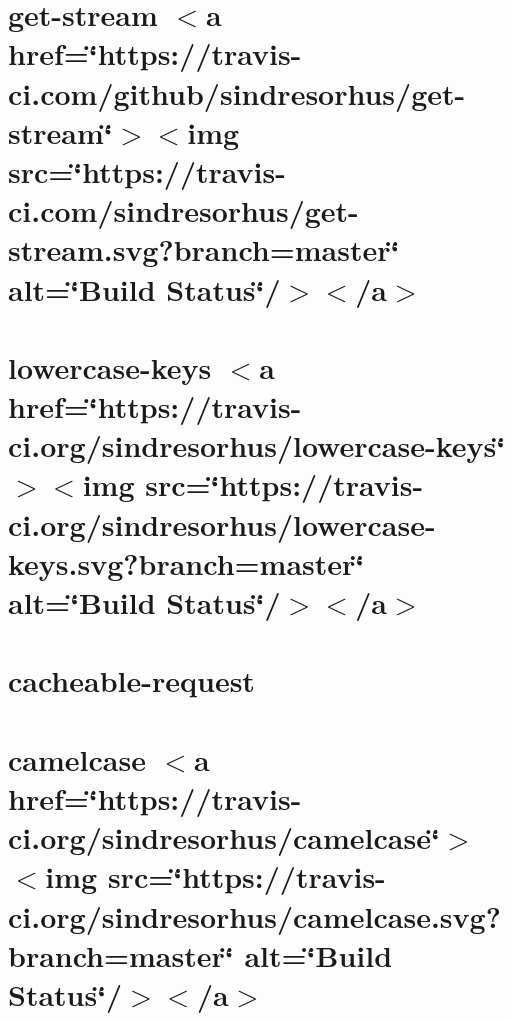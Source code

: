 \let\mypdfximage\pdfximage\def\pdfximage{\immediate\mypdfximage}\documentclass[twoside]{book}
\newcommand{\+}{\discretionary{\mbox{\scriptsize$\hookleftarrow$}}{}{}}
\begin{document}
\chapter{get-\/stream $<$a href=\char`\"{}https\+://travis-\/ci.\+com/github/sindresorhus/get-\/stream\char`\"{}$>$$<$img src=\char`\"{}https\+://travis-\/ci.\+com/sindresorhus/get-\/stream.\+svg?branch=master\char`\"{} alt=\char`\"{}\+Build Status\char`\"{}/$>$$<$/a$>$}
\label{md__c_1__git_hub__p_r_o_y_e_c_t_o-_i_i_i-_g_o_t_rest-api-node-mysql_node_modules_cacheable-requef6d1ecf21f4a8d7f670d67b14790dcb2}

\chapter{lowercase-\/keys $<$a href=\char`\"{}https\+://travis-\/ci.\+org/sindresorhus/lowercase-\/keys\char`\"{}$>$$<$img src=\char`\"{}https\+://travis-\/ci.\+org/sindresorhus/lowercase-\/keys.\+svg?branch=master\char`\"{} alt=\char`\"{}\+Build Status\char`\"{}/$>$$<$/a$>$}
\label{md__c_1__git_hub__p_r_o_y_e_c_t_o-_i_i_i-_g_o_t_rest-api-node-mysql_node_modules_cacheable-requeb9cd633b97f9b0cc042629412cc80185}

\chapter{cacheable-\/request}
\label{md__c_1__git_hub__p_r_o_y_e_c_t_o-_i_i_i-_g_o_t_rest-api-node-mysql_node_modules_cacheable-request__r_e_a_d_m_e}

\chapter{camelcase $<$a href=\char`\"{}https\+://travis-\/ci.\+org/sindresorhus/camelcase\char`\"{}$>$$<$img src=\char`\"{}https\+://travis-\/ci.\+org/sindresorhus/camelcase.\+svg?branch=master\char`\"{} alt=\char`\"{}\+Build Status\char`\"{}/$>$$<$/a$>$}
\label{md__c_1__git_hub__p_r_o_y_e_c_t_o-_i_i_i-_g_o_t_rest-api-node-mysql_node_modules_camelcase_readme}

\end{document}

